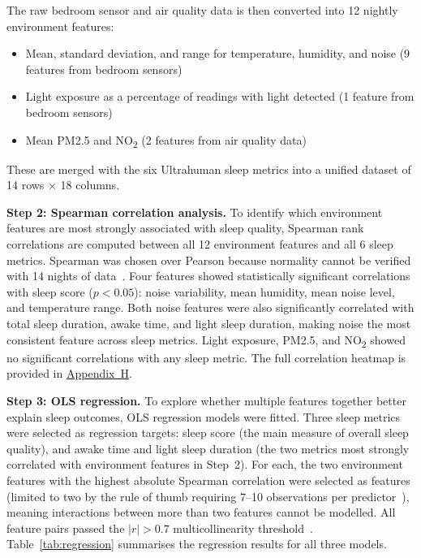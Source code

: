\documentclass[10pt,a4paper]{extarticle}
\begin{document}
The raw bedroom sensor and air quality data is then converted into 12 nightly environment features:

\begin{itemize}[nosep]
    \item Mean, standard deviation, and range for temperature, humidity, and noise (9 features from bedroom sensors)
    \item Light exposure as a percentage of readings with light detected (1 feature from bedroom sensors)
    \item Mean PM2.5 and NO\textsubscript{2} (2 features from air quality data)
\end{itemize}

\noindent These are merged with the six Ultrahuman sleep metrics into a unified dataset of 14 rows $\times$ 18 columns.

\textbf{Step 2: Spearman correlation analysis.} To identify which environment features are most strongly associated with sleep quality, Spearman rank correlations are computed between all 12 environment features and all 6 sleep metrics. Spearman was chosen over Pearson because normality cannot be verified with 14 nights of data~\citep{field2018}. Four features showed statistically significant correlations with sleep score ($p < 0.05$): noise variability, mean humidity, mean noise level, and temperature range. Both noise features were also significantly correlated with total sleep duration, awake time, and light sleep duration, making noise the most consistent feature across sleep metrics. Light exposure, PM2.5, and NO\textsubscript{2} showed no significant correlations with any sleep metric. The full correlation heatmap is provided in \hyperref[app:H]{Appendix~H}.

\textbf{Step 3: OLS regression.} To explore whether multiple features together better explain sleep outcomes, OLS regression models were fitted. Three sleep metrics were selected as regression targets: sleep score (the main measure of overall sleep quality), and awake time and light sleep duration (the two metrics most strongly correlated with environment features in Step~2). For each, the two environment features with the highest absolute Spearman correlation were selected as features (limited to two by the rule of thumb requiring 7--10 observations per predictor~\citep{field2018}), meaning interactions between more than two features cannot be modelled. All feature pairs passed the $|r| > 0.7$ multicollinearity threshold~\citep{dormann2013}. Table~\ref{tab:regression} summarises the regression results for all three models.
\end{document}

